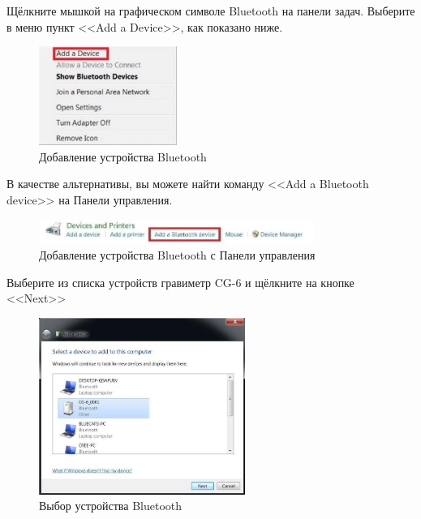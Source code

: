 Щёлкните мышкой на графическом символе Bluetooth \faBluetooth{} на панели задач.
Выберите в меню пункт <<Add a Device>>, как показано ниже.

\begin{figure}[H]
  \centering
  \includegraphics[width=0.4\textwidth]{figures/adding_a_bluetooth_device}
  \caption{Добавление устройства Bluetooth}
  \label{fig:adding_a_bluetooth_device}
\end{figure}

В качестве альтернативы, вы можете найти команду <<Add a Bluetooth device>> на
Панели управления.

\begin{figure}[H]
  \centering
  \includegraphics[width=0.8\textwidth]{figures/adding_a_bluetooth_device_from_the_control_panel}
  \caption{Добавление устройства Bluetooth с Панели управления}
  \label{fig:adding_a_bluetooth_device_from_the_control_panel}
\end{figure}

Выберите из списка устройств гравиметр CG-6 и щёлкните на кнопке <<Next>>

\newpage
\begin{figure}[H]
  \centering
  \includegraphics[width=0.6\textwidth]{figures/selecting_a_bluetooth_device}
  \caption{Выбор устройства Bluetooth}
  \label{fig:selecting_a_bluetooth_device}
\end{figure}


